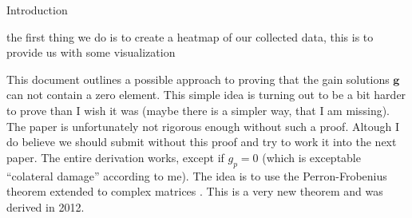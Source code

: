 \documentclass[a4paper,10pt]{article}
\begin{document}
\begin{section}{Introduction}
\begin{algorithm}
\begin{algorithmic}[1]
 \EndProcedure
 \end{algorithmic}
 \end{algorithm}



the first thing we do is to create a heatmap of our collected data, this is to provide us with some visualization 

This document outlines a possible approach to proving that the gain solutions $\boldsymbol{g}$ can not contain a zero element. This simple idea is turning
out to be a bit harder to prove than I wish it was (maybe there is a simpler way, that I am missing). The paper is unfortunately not rigorous enough without such a proof. Altough I do believe we should submit without
this proof and try to work it into the next paper. The entire derivation works, except if $g_p = 0$ (which is exceptable ``colateral damage'' according to me). The idea is
to use the Perron-Frobenius theorem extended to complex matrices \cite{Noutsos2012}. This is a very new theorem and was derived in 2012. 

\end{section}
\end{document}
